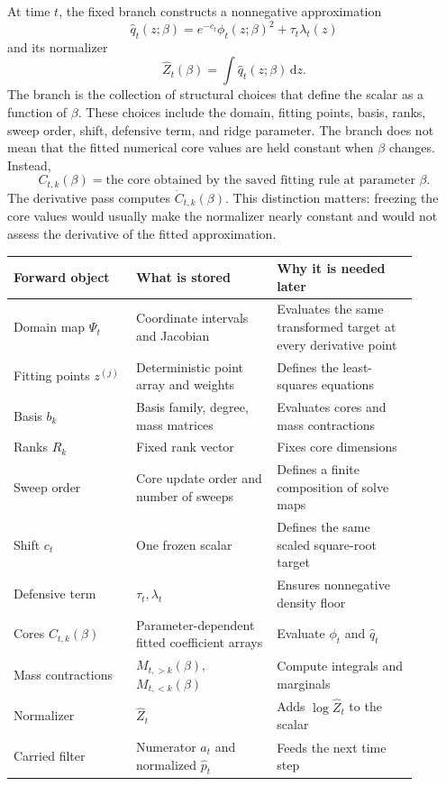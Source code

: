 \documentclass[11pt]{article}
\numberwithin{equation}{section}
\newcommand{\dd}{\,\mathrm d}
\begin{document}
At time \(t\), the fixed branch constructs a nonnegative approximation
\begin{equation}
    \widehat q_t(z;\beta)
    =
    e^{-c_t}\phi_t(z;\beta)^2+\tau_t\lambda_t(z)
    \label{eq:p24-p19-44}
\end{equation}
and its normalizer
\begin{equation}
    \widehat Z_t(\beta)=\int \widehat q_t(z;\beta)\dd z.
    \label{eq:p24-p19-45}
\end{equation}
The branch is the collection of structural choices that define the scalar as a
function of \(\beta\).  These choices include the domain, fitting points, basis,
ranks, sweep order, shift, defensive term, and ridge parameter.  The branch does
not mean that the fitted numerical core values are held constant when
\(\beta\) changes.  Instead,
\begin{equation}
    C_{t,k}(\beta)
    =
    \text{the core obtained by the saved fitting rule at parameter }\beta.
    \label{eq:p24-p19-45a}
\end{equation}
The derivative pass computes \(\dot C_{t,k}(\beta)\).  This distinction matters:
freezing the core values would usually make the normalizer nearly constant and
would not assess the derivative of the fitted approximation.

\begin{center}
\begin{tabular}{p{0.27\linewidth}p{0.31\linewidth}p{0.31\linewidth}}
\toprule
Forward object & What is stored & Why it is needed later\\
\midrule
Domain map \(\Psi_t\) & Coordinate intervals and Jacobian & Evaluates the same transformed target at every derivative point\\
Fitting points \(z^{(j)}\) & Deterministic point array and weights & Defines the least-squares equations\\
Basis \(b_k\) & Basis family, degree, mass matrices & Evaluates cores and mass contractions\\
Ranks \(R_k\) & Fixed rank vector & Fixes core dimensions\\
Sweep order & Core update order and number of sweeps & Defines a finite composition of solve maps\\
Shift \(c_t\) & One frozen scalar & Defines the same scaled square-root target\\
Defensive term & \(\tau_t,\lambda_t\) & Ensures nonnegative density floor\\
Cores \(C_{t,k}(\beta)\) & Parameter-dependent fitted coefficient arrays & Evaluate \(\phi_t\) and \(\widehat q_t\)\\
Mass contractions & \(M_{t,>k}(\beta)\), \(M_{t,<k}(\beta)\) & Compute integrals and marginals\\
Normalizer & \(\widehat Z_t\) & Adds \(\log\widehat Z_t\) to the scalar\\
Carried filter & Numerator \(a_t\) and normalized \(\widehat p_t\) & Feeds the next time step\\
\bottomrule
\end{tabular}
\end{center}
\end{document}
